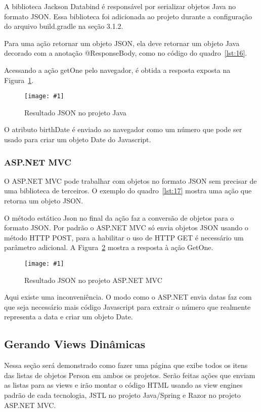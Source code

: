 \documentclass[a4paper,12pt]{article}
\newcommand{\figura}[3] {
	\begin{figure}[ht]
		\centering
		\texttt{[image: \#1]}
		\caption{#2}
		\label{#3}
	\end{figure}
	\FloatBarrier
}
\newcommand{\javacode}[3] {
	
}
\newcommand{\sharpcode}[3] {
	
}
\begin{document}
A biblioteca Jackson Databind é responsável por serializar objetos Java no formato JSON. Essa biblioteca foi adicionada ao projeto durante a configuração do arquivo build.gradle na seção 3.1.2. 

Para uma ação retornar um objeto JSON, ela deve retornar um objeto Java decorado com a anotação @ResponseBody, como no código do quadro~\ref{lst:16}.

\javacode{code/16.txt}{Ação no Spring MVC que retorna um objeto JSON}{lst:16}

Acessando a ação getOne pelo navegador, é obtida a resposta exposta na Figura~\ref{fig:32}.

\figura{32.png}{Resultado JSON no projeto Java}{fig:32}

O atributo birthDate é enviado ao navegador como um número que pode ser usado para criar um objeto Date do Javascript.

\subsubsection{ASP.NET MVC}

O ASP.NET MVC pode trabalhar com objetos no formato JSON sem precisar de uma biblioteca de terceiros. O exemplo do quadro~\ref{lst:17} mostra uma ação que retorna um objeto JSON.

\sharpcode{code/17.txt}{Ação no ASP.NET MVC que retorna um objeto JSON}{lst:17}

O método estático Json no final da ação faz a conversão de objetos para o formato JSON. Por padrão o ASP.NET MVC só envia objetos JSON usando o método HTTP POST, para a habilitar o uso de HTTP GET é necessário um parâmetro adicional. A Figura~\ref{fig:33} mostra a resposta à ação GetOne.

\figura{33.png}{Resultado JSON no projeto ASP.NET MVC}{fig:33}

Aqui existe uma inconveniência. O modo como o ASP.NET envia datas faz com que seja necessário mais código Javascript para extrair o número que realmente representa a data e criar um objeto Date.

\subsection{Gerando Views Dinâmicas}

Nessa seção será demonstrado como fazer uma página que exibe todos os itens das listas de objetos Person em ambos os projetos. Serão feitas ações que enviam as listas para as views e irão montar o código HTML usando as view engines padrão de cada tecnologia, JSTL no projeto Java/Spring e Razor no projeto ASP.NET MVC.
\end{document}

